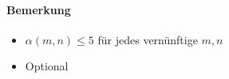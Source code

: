 \begin{itemize}
\paragraph*{Bemerkung} 
\begin{itemize}
 \item $\alpha(m,n) \leq 5$ für jedes vernünftige $m, n$
 \item Optional
\end{itemize}
\end{itemize}